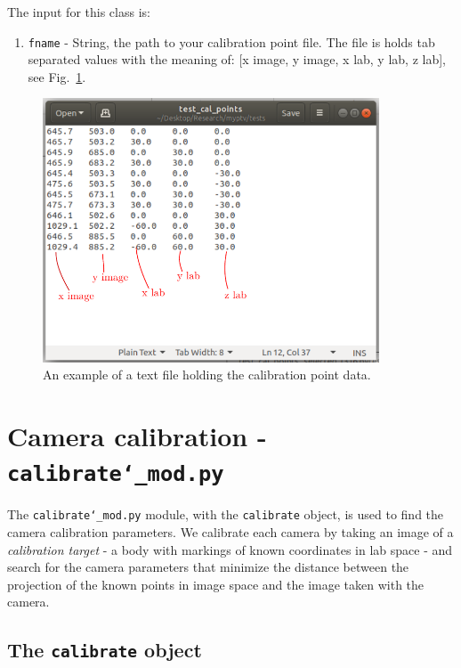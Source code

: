 \documentclass[10pt,a4paper]{article}
\begin{document}
The input for this class is:
\begin{enumerate}
	\item \texttt{fname} - String, the path to your calibration point file. The file is holds tab separated values with the meaning of: [x image, y image, x lab, y lab, z lab], see Fig.~\ref{fig:calpointfile}.
\end{enumerate}



\begin{figure}
	\centering
	\includegraphics[width=10cm]{cal_point_file.pdf}
	\caption{An example of a text file holding the calibration point data. \label{fig:calpointfile}}
\end{figure}





\section{Camera calibration - \texttt{calibrate\char`_mod.py}}


The \texttt{calibrate\char`_mod.py} module, with the \texttt{calibrate} object, is used to find the camera calibration parameters. We calibrate each camera by taking an image of a \textit{calibration target} - a body with markings of known coordinates in lab space - and search for the camera parameters that minimize the distance between the projection of the known points in image space and the image taken with the camera. 



\subsection{The \texttt{calibrate} object}
\end{document}
